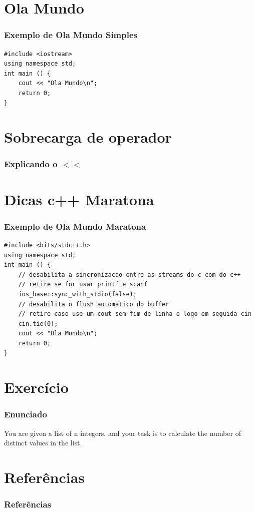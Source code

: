\documentclass[12pt]{beamer}
\begin{document}
\section{Ola Mundo}\label{Ola Mundo}
\begin{frame}[t,fragile]{\insertsectionhead}
    \frametitle{Exemplo de Ola Mundo Simples}
    \begin{lstlisting}
#include <iostream>
using namespace std;
int main () {
    cout << "Ola Mundo\n";
    return 0;
}
    \end{lstlisting}
\end{frame}

\section{Sobrecarga de operador}\label{Sobrecarga de operador}
\begin{frame}
    \frametitle{Explicando o $<<$}
\end{frame}

\section{Dicas c++ Maratona}\label{Dicas c++ Maratona}
\begin{frame}[t,fragile]{\insertsectionhead}
    \frametitle{Exemplo de Ola Mundo Maratona}
    \begin{center}
    \begin{lstlisting}
#include <bits/stdc++.h>
using namespace std;
int main () {
    // desabilita a sincronizacao entre as streams do c com do c++
    // retire se for usar printf e scanf
    ios_base::sync_with_stdio(false);
    // desabilita o flush automatico do buffer
    // retire caso use um cout sem fim de linha e logo em seguida cin
    cin.tie(0);
    cout << "Ola Mundo\n";
    return 0;
}
    \end{lstlisting}
    \end{center}
\end{frame}

\section{Exercício}\label{Exercício}
\begin{frame}
    \frametitle{Enunciado}

    You are given a list of n integers,
    and your task is to calculate the number
    of distinct values in the list.

\end{frame}

\section{Referências}\label{Referências}
\begin{frame}[allowframebreaks]
    \frametitle{Referências}
    
\end{frame}
\end{document}
